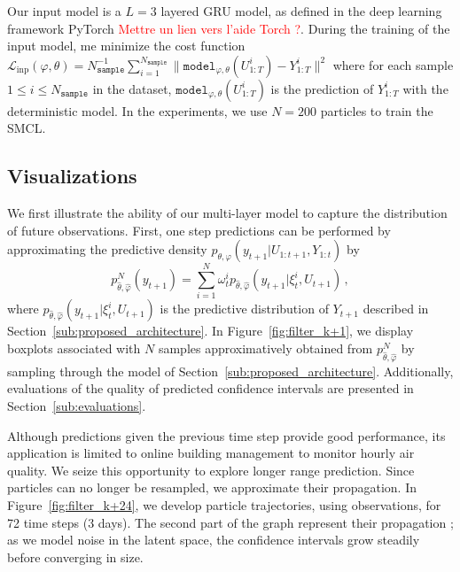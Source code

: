 \documentclass{article}
\begin{document}
Our input model is a $L=3$ layered GRU model, as defined in the deep learning framework PyTorch \textcolor{red}{Mettre un lien vers l'aide Torch ?}.
During the training of the input model, me minimize the cost function $\mathcal{L}_{\mathrm{inp}}(\varphi,\theta) = N_{\texttt{sample}}^{-1} \sum_{i=1}^{N_{\texttt{sample}}} \|\texttt{model}_{\varphi,\theta}(U^i_{1:T}) - Y^i_{1:T}\|^2$ where for each sample $1 \leq i \leq N_{\texttt{sample}}$ in the dataset, $\texttt{model}_{\varphi,\theta}(U^i_{1:T})$ is the prediction of $Y^i_{1:T}$ with the deterministic model.
In the experiments,  we use $N=200$ particles to train the SMCL.

\subsection{Visualizations}%
\label{sub:visualizations}
We first illustrate the ability of our multi-layer model to capture the distribution of future observations. First, one step predictions can be performed by approximating the predictive density $p_{\theta,\varphi}(y_{t+1}|U_{1:t+1},Y_{1:t})$ by
$$
	p^N_{\widehat\theta,\widehat\varphi}(y_{t+1})= \sum_{i=1}^{N}\omega_t^i p_{\widehat\theta,\widehat\varphi}(y_{t+1}|\xi_t^i,U_{t+1})\,,
$$
where $ p_{\widehat\theta,\widehat\varphi}(y_{t+1}|\xi_t^i,U_{t+1})$  is the predictive distribution of $Y_{t+1}$ described in Section~\ref{sub:proposed_architecture}. In Figure~\ref{fig:filter_k+1}, we display boxplots associated with $N$ samples approximatively obtained from $p^N_{\widehat\theta,\widehat\varphi}$ by sampling through the model of Section~\ref{sub:proposed_architecture}. 
Additionally, evaluations of the quality of predicted confidence intervals are presented in Section~\ref{sub:evaluations}.

Although predictions given the previous time step provide good performance, its application is limited to online building management to monitor hourly air quality. We seize this opportunity to explore longer range prediction.
Since particles can no longer be resampled, we approximate their propagation.
In Figure~\ref{fig:filter_k+24}, we develop particle trajectories, using observations, for 72 time steps (3 days).
The second part of the graph represent their propagation ; as we model noise in the latent space, the confidence intervals grow steadily before converging in size.
\end{document}
